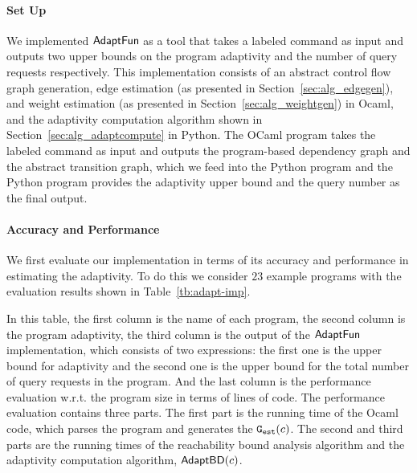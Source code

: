 
\paragraph{Set Up}
We implemented $\textsf{AdaptFun}$ as a tool that takes a labeled command as input 
and outputs two upper bounds on the program adaptivity and the number of query requests respectively.
This implementation consists of an 
abstract control flow graph generation,
edge estimation (as presented in Section~\ref{sec:alg_edgegen}), and weight estimation (as presented in Section~\ref{sec:alg_weightgen}) in Ocaml, 
and the adaptivity computation algorithm shown in Section~\ref{sec:alg_adaptcompute} in Python.
The OCaml program takes the labeled command as input and outputs the program-based dependency graph and
the abstract transition graph, which we
feed into the Python program and the Python program provides the adaptivity upper bound and the query number as the final output.


\paragraph{Accuracy and Performance}

We first evaluate our implementation in terms of its accuracy and performance in estimating the adaptivity. To do this we consider $23$ example programs with the evaluation results shown in Table~\ref{tb:adapt-imp}.

In this table,
the first column is the name of each program, the second column is the program adaptivity,
the third column is the output of the $\textsf{AdaptFun}$ implementation, which consists of two expressions:
the first one is the upper bound for adaptivity and the second one is the 
upper bound for the total number of query requests in the program. And the last column is the performance evaluation w.r.t. the program size in terms of lines of code.
The performance evaluation contains three parts. The first part is the running time of the Ocaml code, which parses the program and generates the $\mathtt{{G_{est}}}(c)$.
The second and third parts are the running times of the reachability bound analysis algorithm
and the adaptivity computation algorithm, $\mathsf{AdaptBD}(c)$.

